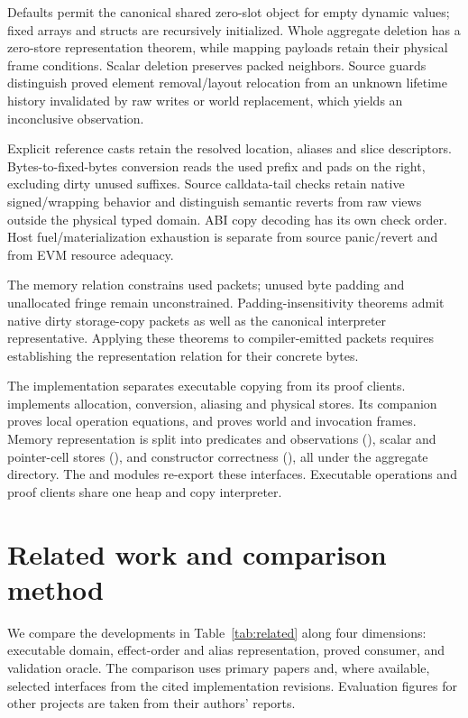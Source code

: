 \documentclass[conference]{IEEEtran}
\begin{document}
Defaults permit the canonical shared zero-slot object for empty dynamic values;
fixed arrays and structs are recursively initialized. Whole aggregate deletion
has a zero-store representation theorem, while mapping payloads retain their
physical frame conditions. Scalar deletion preserves packed neighbors.
Source guards distinguish proved element removal/layout relocation from an
unknown lifetime history invalidated by raw writes or world replacement,
which yields an inconclusive observation.

Explicit reference casts retain the resolved location, aliases and slice
descriptors. Bytes-to-fixed-bytes conversion reads the used prefix and pads on
the right, excluding dirty unused suffixes. Source calldata-tail checks retain
native signed/wrapping behavior and distinguish semantic reverts from raw views
outside the physical typed domain. ABI copy decoding has its own check order.
Host fuel/materialization exhaustion is separate from source panic/revert and
from EVM resource adequacy.

The memory relation constrains used packets; unused byte padding and unallocated
fringe remain unconstrained. Padding-insensitivity theorems admit native dirty
storage-copy packets as well as the canonical interpreter representative.
Applying these theorems to compiler-emitted packets requires establishing the
representation relation for their concrete bytes.

The implementation separates executable copying from its proof clients.
 implements allocation, conversion,
aliasing and physical stores. Its  companion proves local
operation equations, and  proves world and invocation frames.
Memory representation is split into predicates and observations
(), scalar and pointer-cell stores
(), and constructor correctness
(), all under the aggregate directory.
The  and  modules re-export these
interfaces. Executable operations and proof clients share one heap and copy
interpreter.

\section{Related work and comparison method}
We compare the developments in Table~\ref{tab:related} along four dimensions:
executable domain, effect-order and alias representation, proved consumer, and
validation oracle. The comparison uses primary papers and, where available,
selected interfaces from the cited implementation revisions. Evaluation figures
for other projects are taken from their authors' reports.
\end{document}
